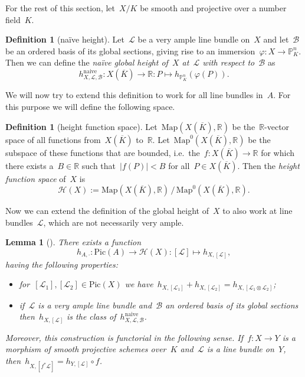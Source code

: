 \documentclass[12pt]{article}
\newtheorem{lemma}[theorem]{Lemma}
\theoremstyle{definition}
\newtheorem{definition}[theorem]{Definition}
\numberwithin{equation}{subsection}
\newcommand{\R}{\ensuremath{\mathbb{R}}}
\renewcommand{\P}{\ensuremath{\mathbb{P}}}
\newcommand{\Pic}{\mathrm{Pic}}
\begin{document}
For the rest of this section, let~$X/K$ be smooth and projective over a number field~$K$.

\begin{definition}[na\"ive height]
Let~$\mathcal{L}$ be a very ample line bundle on~$X$ and let~$\mathcal{B}$ be an ordered basis of its global sections, giving rise to an immersion~$\varphi \colon X \rightarrow \P^n_K$. Then we can define the {\em na\"ive global height of~$X$ at~$\mathcal{L}$ with respect to~$\mathcal{B}$} as
$$h_{X,\mathcal{L},\mathcal{B}}^{\textrm{naive}}\colon X(\overline{K}) \rightarrow \R \colon P \mapsto h_{\P^n_K}(\varphi(P)).$$
\end{definition}

We will now try to extend this definition to work for all line bundles in~$A$. For this purpose we will define the following space.

\begin{definition}[height function space]
Let~$\textrm{Map}(X(\overline{K}), \R)$ be the~$\R$-vector space of all functions from~$X(\overline{K})$ to~$\R$. Let~$\textrm{Map}^0(X(\overline{K}), \R)$ be the subspace of these functions that are bounded, i.e.\ the~$f \colon X(\overline{K}) \to \R$ for which there exists a~$B \in \R$ such that~$|f(P)| < B$ for all~$P \in X(\overline{K})$. Then the {\em height function space} of~$X$ is~$$\mathcal{H}(X) := \mathrm{Map}(X(\overline{K}), \R) \, / \, \mathrm{Map}^0(X(\overline{K}), \R).$$
\end{definition}

Now we can extend the definition of the global height of~$X$ to also work at line bundles~$\mathcal{L}$, which are not necessarily very ample.

\begin{lemma}[\textrm{\cite[Thm.\ 5.1, sect.\ 4.5, p.\ 93]{Lang}}]\label{thm:heightPic}
There exists a function~$$h_{A, \cdot} \colon \Pic(A) \rightarrow \mathcal{H}(X) \colon [\mathcal{L}] \mapsto h_{X,[\mathcal{L}]},$$ having the following properties:\\[-0.8cm]
\begin{itemize}\itemsep0pt
\item[--] for~$[\mathcal{L}_1], [\mathcal{L}_2] \in \Pic(X)$ we have~$h_{X,[\mathcal{L}_1]} + h_{X,[\mathcal{L}_2]} = h_{X,[\mathcal{L}_1 \otimes \mathcal{L}_2]}$;
\item[--] if~$\mathcal{L}$ is a very ample line bundle and~$\mathcal{B}$ an ordered basis of its global sections then~$h_{X,[\mathcal{L}]}$ is the class of~$h_{X,\mathcal{L},\mathcal{B}}^{\mathrm{naive}}$.
\end{itemize}
Moreover, this construction is functorial in the following sense. If~$f \colon X \rightarrow Y$ is a morphism of smooth projective schemes over~$K$ and~$\mathcal{L}$ is a line bundle on~$Y$, then~$h_{X, [f^*\mathcal{L}]} = h_{Y, [\mathcal{L}]} \circ f$. 
\end{lemma}
\end{document}
